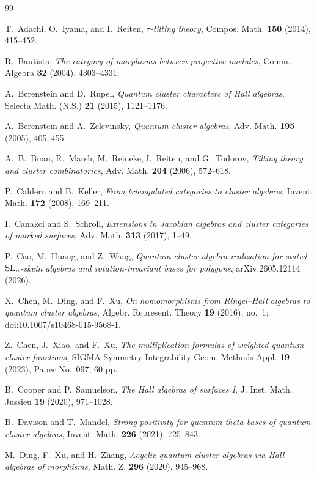 \begin{thebibliography}{99}

T.~Adachi, O.~Iyama, and I.~Reiten,
\emph{$\tau$-tilting theory},
Compos. Math. \textbf{150} (2014), 415--452.

R.~Bautista,
\emph{The category of morphisms between projective modules},
Comm. Algebra \textbf{32} (2004), 4303--4331.

A.~Berenstein and D.~Rupel,
\emph{Quantum cluster characters of Hall algebras},
Selecta Math. (N.S.) \textbf{21} (2015), 1121--1176.

A.~Berenstein and A.~Zelevinsky,
\emph{Quantum cluster algebras},
Adv. Math. \textbf{195} (2005), 405--455.

A.~B.~Buan, R.~Marsh, M.~Reineke, I.~Reiten, and G.~Todorov,
\emph{Tilting theory and cluster combinatorics},
Adv. Math. \textbf{204} (2006), 572--618.

P.~Caldero and B.~Keller,
\emph{From triangulated categories to cluster algebras},
Invent. Math. \textbf{172} (2008), 169--211.

I.~Canakci and S.~Schroll,
\emph{Extensions in Jacobian algebras and cluster categories of marked
surfaces},
Adv. Math. \textbf{313} (2017), 1--49.

P.~Cao, M.~Huang, and Z.~Wang,
\emph{Quantum cluster algebra realization for stated ${\rm SL}_n$-skein
algebras and rotation-invariant bases for polygons},
arXiv:2605.12114 (2026).

X.~Chen, M.~Ding, and F.~Xu,
\emph{On homomorphisms from Ringel--Hall algebras to quantum cluster
algebras},
Algebr. Represent. Theory \textbf{19} (2016), no.~1;
doi:10.1007/s10468-015-9568-1.

Z.~Chen, J.~Xiao, and F.~Xu,
\emph{The multiplication formulas of weighted quantum cluster functions},
SIGMA Symmetry Integrability Geom. Methods Appl. \textbf{19} (2023),
Paper No.~097, 60 pp.

B.~Cooper and P.~Samuelson,
\emph{The Hall algebras of surfaces I},
J. Inst. Math. Jussieu \textbf{19} (2020), 971--1028.

B.~Davison and T.~Mandel,
\emph{Strong positivity for quantum theta bases of quantum cluster algebras},
Invent. Math. \textbf{226} (2021), 725--843.

M.~Ding, F.~Xu, and H.~Zhang,
\emph{Acyclic quantum cluster algebras via Hall algebras of morphisms},
Math. Z. \textbf{296} (2020), 945--968.


\end{thebibliography}
